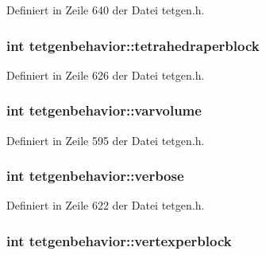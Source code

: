Definiert in Zeile 640 der Datei tetgen.\-h.

\hypertarget{classtetgenbehavior_a8780a33de02550bb0197026cc4fa4dca}{
\subsubsection[{tetrahedraperblock}]{\setlength{\rightskip}{0pt plus 5cm}int tetgenbehavior\-::tetrahedraperblock}}\label{classtetgenbehavior_a8780a33de02550bb0197026cc4fa4dca}


Definiert in Zeile 626 der Datei tetgen.\-h.

\hypertarget{classtetgenbehavior_a59fc93472c81cfe360ddb76c7e008d8e}{
\subsubsection[{varvolume}]{\setlength{\rightskip}{0pt plus 5cm}int tetgenbehavior\-::varvolume}}\label{classtetgenbehavior_a59fc93472c81cfe360ddb76c7e008d8e}


Definiert in Zeile 595 der Datei tetgen.\-h.

\hypertarget{classtetgenbehavior_a11376e8556a93b4ccc0472ca7db84d2e}{
\subsubsection[{verbose}]{\setlength{\rightskip}{0pt plus 5cm}int tetgenbehavior\-::verbose}}\label{classtetgenbehavior_a11376e8556a93b4ccc0472ca7db84d2e}


Definiert in Zeile 622 der Datei tetgen.\-h.

\hypertarget{classtetgenbehavior_a0706697ee85e4d4c7ea4b581df3c0786}{
\subsubsection[{vertexperblock}]{\setlength{\rightskip}{0pt plus 5cm}int tetgenbehavior\-::vertexperblock}}\label{classtetgenbehavior_a0706697ee85e4d4c7ea4b581df3c0786}


